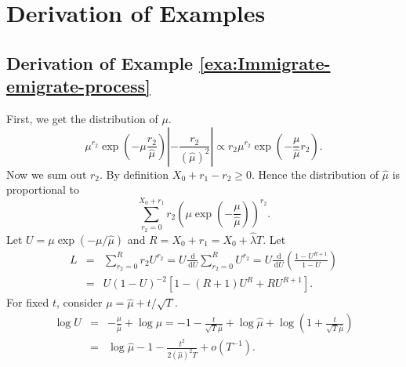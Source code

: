 \documentclass[oneside,english]{amsbook}
\numberwithin{section}{chapter}
\numberwithin{equation}{section}
\numberwithin{figure}{section}
\theoremstyle{plain}
\theoremstyle{plain}
\theoremstyle{definition}
\theoremstyle{plain}
\theoremstyle{plain}
\theoremstyle{remark}
\theoremstyle{definition}
\theoremstyle{definition}
\newcommand{\diff}{\,\mathrm{d}}
\begin{document}
\section{Derivation of Examples}


\subsection{\label{sub:Derivation-of-Example-1}Derivation of Example \ref{exa:Immigrate-emigrate-process}}

First, we get the distribution of $\mu$. 
\[
\mu^{r_{2}}\exp\left(-\mu\frac{r_{2}}{\hat{\mu}}\right)\left|-\frac{r_{2}}{\left(\hat{\mu}\right)^{2}}\right|\propto r_{2}\mu^{r_{2}}\exp\left(-\frac{\mu}{\hat{\mu}}r_{2}\right).
\]
Now we sum out $r_{2}$. By definition $X_{0}+r_{1}-r_{2}\ge0$. Hence
the distribution of $\hat{\mu}$ is proportional to 
\[
\sum_{r_{2}=0}^{X_{0}+r_{1}}r_{2}\left(\mu\exp\left(-\frac{\mu}{\hat{\mu}}\right)\right)^{r_{2}}.
\]
Let $U=\mu\exp\left(-\mu/\hat{\mu}\right)$ and $R=X_{0}+r_{1}=X_{0}+\hat{\lambda}T$.
Let 
\begin{eqnarray*}
L & = & \sum_{r_{2}=0}^{R}r_{2}U^{r_{2}}=U\frac{\diff}{\diff U}\sum_{r_{2}=0}^{R}U^{r_{2}}=U\frac{\diff}{\diff U}\left(\frac{1-U^{R+1}}{1-U}\right)\\
 & = & U\left(1-U\right)^{-2}\left[1-\left(R+1\right)U^{R}+RU^{R+1}\right].
\end{eqnarray*}
For fixed $t$, consider $\mu=\hat{\mu}+t/\sqrt{T}$. 
\begin{eqnarray*}
\log U & = & -\frac{\mu}{\hat{\mu}}+\log\mu=-1-\frac{t}{\sqrt{T}\hat{\mu}}+\log\hat{\mu}+\log\left(1+\frac{t}{\sqrt{T}\hat{\mu}}\right)\\
 & = & \log\hat{\mu}-1-\frac{t^{2}}{2\left(\hat{\mu}\right)^{2}T}+o\left(T^{-1}\right).
\end{eqnarray*}
\end{document}
